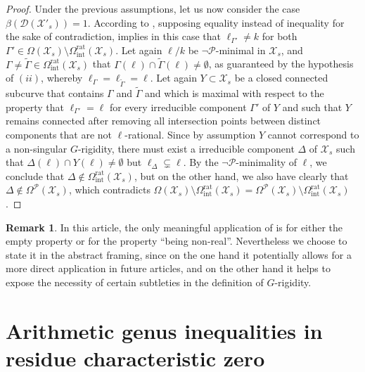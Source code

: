 \documentclass[a4paper,12pt,reqno]{amsart}
\newcommand\mc\mathcal
\theoremstyle{definition}
\newtheorem{rem}[thm]{Remark}
\numberwithin{equation}{thm}
\begin{document}
\begin{proof}
Under the previous assumptions, let us now consider the case $\beta(\mc{D}(\mathcal{X}'_s)) =1$. According to
 , supposing equality instead of inequality for the sake of contradiction, implies in this case that $\ell_{\Gamma'}\neq k$ for both $\Gamma'\in \Omega(\mc{X}_s) \setminus \Omega^\mathrm{rat}_{\mathrm{int}}(\mc{X}_s)$.  Let again $\ell/k$ be  $\neg\mathcal{P}$-minimal in $\mc{X}_s$, and $\Gamma \neq \widetilde{\Gamma} \in \Omega^\mathrm{rat}_{\mathrm{int}}(\mc{X}_s)$ that $\Gamma(\ell) \cap \widetilde{\Gamma}(\ell) \neq \emptyset$, as guaranteed by the hypothesis of $(ii)$, whereby $\ell_\Gamma = \ell_{\widetilde{\Gamma}}=\ell$. Let again  $Y \subset \mc{X}_s$ be a closed connected subcurve  that contains  $\Gamma$ and $\widetilde{\Gamma}$ and which is maximal with respect to the property that $\ell_{\Gamma'}= \ell$ for every irreducible component $\Gamma'$ of $Y$ and such that $Y$ remains connected after removing all intersection points between distinct components that are not $\ell$-rational. Since by assumption $Y$ cannot correspond to a non-singular $G$-rigidity, there must exist a irreducible component $\Delta$ of $\mc{X}_s$ such that $\Delta(\ell) \cap Y(\ell) \neq \emptyset$ but $\ell_\Delta \subsetneq \ell$. By the $\neg\mathcal{P}$-minimality of $\ell$, we conclude that $\Delta \notin \Omega^\mathrm{rat}_{\mathrm{int}}(\mc{X}_s)$, but on the other hand, we also have clearly that $\Delta \notin \Omega^{\mathcal{P}}(\mc{X}_s)$, which contradicts $ \Omega(\mc{X}_s) \setminus \Omega^\mathrm{rat}_{\mathrm{int}}(\mc{X}_s)  =  \Omega^{\mathcal{P}}(\mc{X}_s) \setminus \Omega^\mathrm{rat}_{\mathrm{int}}(\mc{X}_s)$.
\end{proof}

\begin{rem}
    In this article, the only meaningful application of  is for either the empty property or for the property ``being non-real''. Nevertheless we choose to state it in the abstract framing, since on the one hand it potentially allows for  a more direct application in future articles, and on the other hand it helps to expose the necessity of certain subtleties in the definition of $G$-rigidity.
\end{rem}

\section{Arithmetic genus inequalities in residue characteristic zero}
\end{document}
